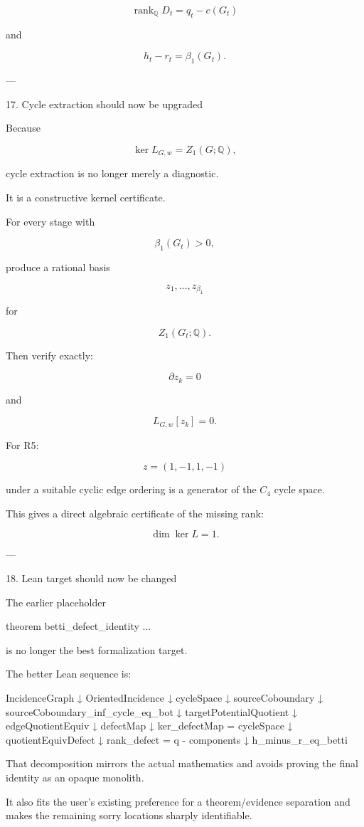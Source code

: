 \[
\boxed{
\operatorname{rank}_{\mathbb Q}D_t
=
q_t-c(G_t)
}
\]

and

\[
\boxed{
h_t-r_t=\beta_1(G_t).
}
\]


---

17. Cycle extraction should now be upgraded

Because

\[
\ker L_{G,w}=Z_1(G;\mathbb Q),
\]

cycle extraction is no longer merely a diagnostic.

It is a constructive kernel certificate.

For every stage with

\[
\beta_1(G_t)>0,
\]

produce a rational basis

\[
z_1,\ldots,z_{\beta_1}
\]

for

\[
Z_1(G_t;\mathbb Q).
\]

Then verify exactly:

\[
\partial z_k=0
\]

and

\[
L_{G,w}[z_k]=0.
\]

For R5:

\[
z=(1,-1,1,-1)
\]

under a suitable cyclic edge ordering is a generator of the \(C_4\) cycle space.

This gives a direct algebraic certificate of the missing rank:

\[
\boxed{
\dim\ker L=1.
}
\]


---

18. Lean target should now be changed

The earlier placeholder

theorem betti_defect_identity ...

is no longer the best formalization target.

The better Lean sequence is:

IncidenceGraph
    ↓
OrientedIncidence
    ↓
cycleSpace
    ↓
sourceCoboundary
    ↓
sourceCoboundary_inf_cycle_eq_bot
    ↓
targetPotentialQuotient
    ↓
edgeQuotientEquiv
    ↓
defectMap
    ↓
ker_defectMap = cycleSpace
    ↓
quotientEquivDefect
    ↓
rank_defect = q - components
    ↓
h_minus_r_eq_betti

That decomposition mirrors the actual mathematics and avoids proving the final identity as an opaque monolith.

It also fits the user's existing preference for a theorem/evidence separation and makes the remaining sorry locations sharply identifiable.


